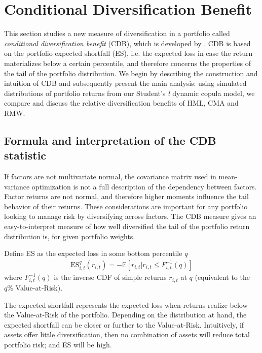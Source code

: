 
\section{Conditional Diversification Benefit} %
\label{sec:conditional_diversification_benefit}

This section studies a new measure of diversification in a portfolio called \emph{conditional diversification benefit} (CDB), which is developed by \textcite{ChristoffersenErrunzaJacobLanglois2012}. CDB is based on the portfolio expected shortfall (ES), i.e. the expected loss in case the return materializes below a certain percentile, and therefore concerns the properties of the tail of the portfolio distribution. We begin by describing the construction and intuition of CDB and subsequently present the main analysis: using simulated distributions of portfolio returns from our Student's \textit{t} dynamic copula model, we compare and discuss the relative diversification benefits of HML, CMA and RMW.

\subsection{Formula and interpretation of the CDB statistic}

If factors are not multivariate normal, the covariance matrix used in mean-variance optimization is not a full description of the dependency between factors. Factor returns are not normal, and therefore higher moments influence the tail behavior of their returns. These considerations are important for any portfolio looking to manage risk by diversifying across factors. The CDB measure gives an easy-to-interpret measure of how well diversified the tail of the portfolio return distribution is, for given portfolio weights.

Define ES as the expected loss in some bottom percentile $q$
\begin{align}
    \text{ES}_{i,t}^q(r_{i,t}) = -\mathbb{E}[r_{i,t} | r_{i,t} \leq F_{i,t}^{-1}(q)]
\end{align}
where $F_{i,t}^{-1}(q)$ is the inverse CDF of simple returns $r_{i,t}$ at $q$ (equivalent to the $q\%$ Value-at-Risk). 

The expected shortfall represents the expected loss when returns realize below the Value-at-Risk of the portfolio. Depending on the distribution at hand, the expected shortfall can be closer or further to the Value-at-Risk. Intuitively, if assets offer little diversification, then no combination of assets will reduce total portfolio risk; and ES will be high. 

